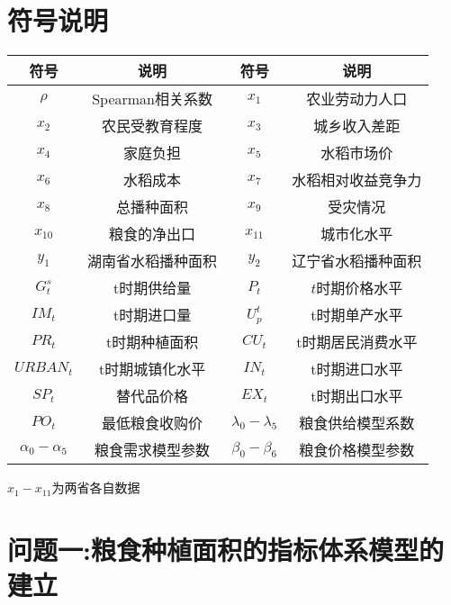 \documentclass[withoutpreface,bwprint]{cumcmthesis} %
\begin{document}
	
	
	
	
	\newpage
	\section{符号说明}
	\begin{table}[!htbp]
		\centering
		\label{tabfuhao}
		\setlength\tabcolsep{20pt}%
		\begin{tabular}{cccc}
		\toprule[1.5pt]
		符号 & 说明 & 符号 & 说明 \\
		\midrule[1pt]
	$\rho$ & Spearman相关系数 & $x_1$ &农业劳动力人口 \\
	$x_2$ & 农民受教育程度 & $x_3$ &城乡收入差距\\
	$x_4$ & 家庭负担 & $x_5$ & 水稻市场价\\
	$x_6$ & 水稻成本 & $x_7$ & 水稻相对收益竞争力\\
	$x_8$ & 总播种面积 & $x_9$ & 受灾情况 \\
	$x_{10}$ & 粮食的净出口 & $x_{11}$ & 城市化水平\\
	$y_1$ & 湖南省水稻播种面积 & $y_2$ &辽宁省水稻播种面积\\
	$G_t^s$&t时期供给量&$P_{t}$&$t$时期价格水平\\
	$IM_t$&t时期进口量&$U_p^t$&t时期单产水平\\
	$PR_t$&t时期种植面积&$CU_t$&t时期居民消费水平\\
	$URBAN_t$&t时期城镇化水平&$IN_t$&t时期进口水平\\
	$SP_t$&替代品价格&$EX_t$&t时期出口水平\\
	$PO_t$&最低粮食收购价&$\lambda_0-\lambda_5$&粮食供给模型系数\\
	$\alpha_{0}-\alpha_{5}$&粮食需求模型参数&$\beta_{0}-\beta_{6}$&粮食价格模型参数\\
		\bottomrule[1.5pt]
		\end{tabular}
	\end{table}
$x_1-x_{11}$为两省各自数据
	




	











	
		\section{问题一:粮食种植面积的指标体系模型的建立}
\end{document}
